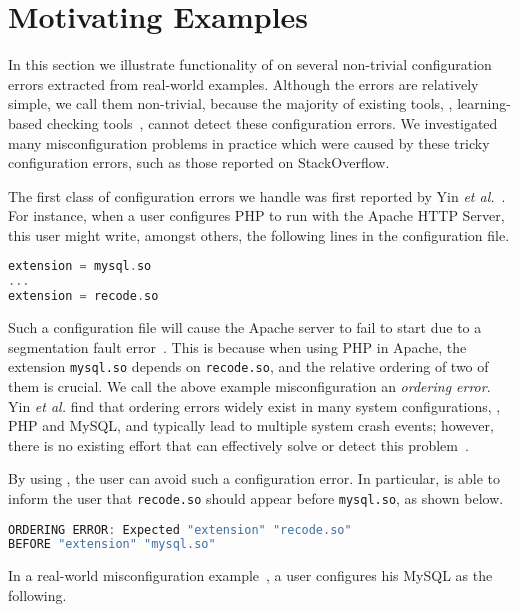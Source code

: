 \section{Motivating Examples}
\label{sec-motiv}

In this section we illustrate functionality of \app on several non-trivial configuration errors
extracted from real-world examples. Although the errors are relatively simple, we call them 
non-trivial, because the majority of existing tools, \eg, learning-based checking
tools~\cite{zhang14encore, wang04automatic}, cannot detect
these configuration errors. We investigated 
many misconfiguration problems in practice which were caused by 
these tricky configuration errors, such as those reported on StackOverflow.

The first class of configuration errors we handle was first reported by 
Yin {\em et al.}~\cite{yin11anempirical}.
For instance, when a user configures PHP to run with the
Apache HTTP Server, this user might write, amongst others, 
the following lines in the configuration file.

\begin{lstlisting}[language=C, xleftmargin=.01\textwidth]
extension = mysql.so
...
extension = recode.so
\end{lstlisting} 

Such a configuration file will cause the Apache server to 
fail to start due to a segmentation fault error~\cite{yin11anempirical}. 
This is because when using PHP in Apache, the extension {\tt mysql.so} 
depends on {\tt recode.so}, and the relative ordering of two of them 
is crucial. 
We call the above example misconfiguration 
an {\em ordering error}.
Yin {\em et al.} find that ordering errors widely exist in
many system configurations, \eg, PHP and MySQL,
and typically lead to multiple system crash events;
however, there is no existing effort that can effectively solve 
or detect this problem~\cite{zhang14encore, xu15systems, xu13do}.

By using \app, the user can avoid such a configuration error.
In particular, \app is able to inform the user that {\tt recode.so} 
should appear before {\tt mysql.so}, as shown
below.

\begin{lstlisting}[language=C, xleftmargin=.01\textwidth]
ORDERING ERROR: Expected "extension" "recode.so"
BEFORE "extension" "mysql.so"
\end{lstlisting} 

In a real-world misconfiguration example~\cite{correlation}, 
a user configures his MySQL as the following.


